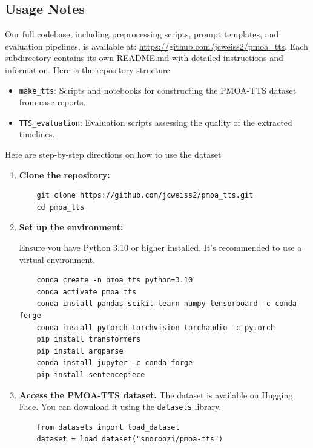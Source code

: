 \subsection{Usage Notes}
\label{ch05:sec:usage-notes}

Our full codebase, including preprocessing scripts, prompt templates, and evaluation pipelines,
is available at: \url{https://github.com/jcweiss2/pmoa_tts}.
Each subdirectory contains its own README.md with detailed instructions and information.
Here is the repository structure
\begin{itemize}
    \item \texttt{make\_tts}: Scripts and notebooks for constructing the PMOA-TTS dataset from case reports.
    \item \texttt{TTS\_evaluation}: Evaluation scripts assessing the quality of the extracted timelines.
\end{itemize}

\noindent Here are step-by-step directions on how to use the dataset

\begin{enumerate}

\item \textbf{Clone the repository:}

{\small
\begin{verbatim}
    git clone https://github.com/jcweiss2/pmoa_tts.git
    cd pmoa_tts
\end{verbatim}
}

\item \textbf{Set up the environment:}

\noindent Ensure you have Python 3.10 or higher installed. It's recommended to use a virtual environment.

{\small
\begin{verbatim}
    conda create -n pmoa_tts python=3.10
    conda activate pmoa_tts
    conda install pandas scikit-learn numpy tensorboard -c conda-forge
    conda install pytorch torchvision torchaudio -c pytorch
    pip install transformers
    pip install argparse
    conda install jupyter -c conda-forge
    pip install sentencepiece
\end{verbatim}
}

\item \textbf{Access the PMOA-TTS dataset.} The dataset is available on Hugging Face.
You can download it using the \texttt{datasets} library.

{\small
\begin{verbatim}
    from datasets import load_dataset
    dataset = load_dataset("snoroozi/pmoa-tts")
\end{verbatim}
}

\end{enumerate}

